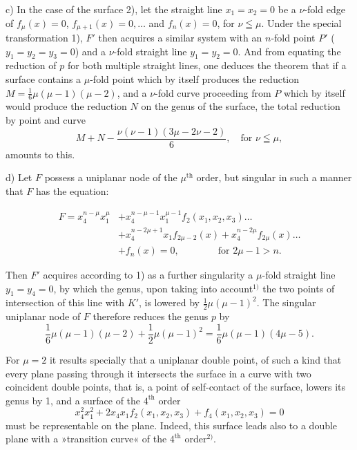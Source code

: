 \documentclass{article}
\begin{document}
c) In the case of the surface 2), let the straight line $x_1 = x_2 = 0$ be a $\nu$-fold edge of $f_\mu(x) = 0$, $f_{\mu+1}(x) = 0, \ldots$ and $f_n(x) = 0$, for $\nu \leqq \mu$. Under the special transformation 1), $F'$ then acquires a similar system with an $n$-fold point $P'$ ($y_1 = y_2 = y_3 = 0$) and a $\nu$-fold straight line $y_1 = y_2 = 0$. And from equating the reduction of $p$ for both multiple straight lines, one deduces the theorem that if a surface contains a $\mu$-fold point which by itself produces the reduction $M = \frac{1}{6}\mu(\mu-1)(\mu-2)$, and a $\nu$-fold curve proceeding from $P$ which by itself would produce the reduction $N$ on the genus of the surface, the total reduction by point and curve
\[ M + N - \frac{\nu(\nu-1)(3\mu-2\nu-2)}{6}, \quad \text{for } \nu \leqq \mu, \]
amounts to this.

d) Let $F$ possess a uniplanar node of the $\mu^{\text{th}}$ order, but singular in such a manner that $F$ has the equation:

\[
\begin{aligned}
F = x_4^{n-\mu} x_1^\mu &+ x_4^{n-\mu-1} x_1^{\mu-1} f_2(x_1, x_2, x_3) \ldots \\
&+ x_4^{n-2\mu+1} x_1 f_{2\mu-2}(x) + x_4^{n-2\mu} f_{2\mu}(x) \ldots \\
&+ f_n(x) = 0, \qquad\qquad \text{for } 2\mu-1 > n.
\end{aligned}
\]

Then $F'$ acquires according to 1) as a further singularity a $\mu$-fold straight line $y_1 = y_4 = 0$, by which the genus, upon taking into account${}^{1)}$ the two points of intersection of this line with $K'$, is lowered by $\frac{1}{2}\mu(\mu-1)^2$. The singular uniplanar node of $F$ therefore reduces the genus $p$ by
\[ \frac{1}{6}\mu(\mu-1)(\mu-2) + \frac{1}{2}\mu(\mu-1)^2 = \frac{1}{6}\mu(\mu-1)(4\mu-5). \]

For $\mu = 2$ it results specially that a uniplanar double point, of such a kind that every plane passing through it intersects the surface in a curve with two coincident double points, that is, a point of self-contact of the surface, lowers its genus by 1, and a surface of the $4^{\text{th}}$ order
\[ x_4^2 x_1^2 + 2 x_4 x_1 f_2(x_1, x_2, x_3) + f_4(x_1, x_2, x_3) = 0 \]
must be representable on the plane. Indeed, this surface leads also to a double plane with a »transition curve« of the $4^{\text{th}}$ order${}^{2)}$.
\end{document}
